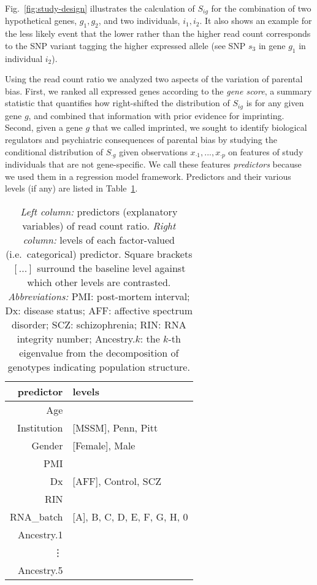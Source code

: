 \documentclass[letterpaper]{article}
\begin{document}
Fig.~\ref{fig:study-design} illustrates the calculation of \(S_{ig}\) for the
combination of two hypothetical genes, \(g_1,g_2\), and two individuals,
\(i_1,i_2\).  It also shows an example for the less likely event that the lower rather
than the higher read count corresponds to the SNP variant tagging the higher
expressed allele (see SNP \(s_3\) in gene \(g_1\) in individual \(i_2\)).

Using the read count ratio we analyzed two aspects of the variation of
parental bias.  First, we ranked all expressed genes according to the
\emph{gene score}, a summary statistic that quantifies how right-shifted the
distribution of \(S_{ig}\) is for any given gene \(g\), and combined that
information with prior evidence for imprinting.  Second, given a gene \(g\)
that we called imprinted, we sought to identify biological regulators and
psychiatric consequences of parental bias by studying the conditional
distribution of \(S_{\cdot g}\) given observations \(x_{\cdot 1},...,x_{\cdot
p}\) on features of study individuals that are not gene-specific. We call
these features \emph{predictors} because we used them in a regression model
framework.  Predictors and their various levels (if any) are listed in
Table~\ref{tab:predictors}.

\begin{table}
\begin{center}
\begin{tabular}{r|l}
predictor & levels\\
\hline
Age &  \\
Institution & [MSSM], Penn, Pitt\\
Gender & [Female], Male\\
PMI & \\
Dx & [AFF], Control, SCZ\\
RIN &  \\
RNA\_batch & [A], B, C, D, E, F, G, H, 0\\
Ancestry.1 & \\
\vdots & \\
Ancestry.5 &  \\
\end{tabular}
\caption{ \emph{Left column:} predictors (explanatory variables) of read count
ratio.  \emph{Right column:} levels of each factor-valued (i.e.~categorical)
predictor.  Square brackets \([...]\) surround the baseline level against
which other levels are contrasted.  \emph{Abbreviations:} PMI: post-mortem
interval; Dx: disease status; AFF: affective spectrum disorder; SCZ:
schizophrenia; RIN: RNA integrity number;
Ancestry.\(k\): the \(k\)-th eigenvalue from the decomposition of genotypes
indicating population structure.}
\label{tab:predictors}
\end{center}
\end{table}
\end{document}
